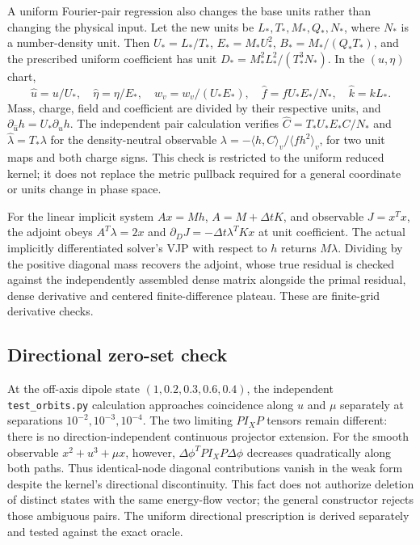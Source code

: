 \documentclass[11pt,letterpaper]{article}
\begin{document}
A uniform Fourier-pair regression also changes the base units rather than
changing the physical input. Let the new units be $L_*,T_*,M_*,Q_*,N_*$,
where $N_*$ is a number-density unit. Then $U_*=L_*/T_*$,
$E_*=M_*U_*^2$, $B_*=M_*/(Q_*T_*)$, and the prescribed uniform coefficient
has unit $D_*=M_*^2L_*^2/(T_*^3N_*)$. In the $(u,\eta)$ chart,
\[
 \widehat u=u/U_*,\quad\widehat\eta=\eta/E_*,\quad
 \widehat w_v=w_v/(U_*E_*),\quad
 \widehat f=fU_*E_*/N_*,\quad\widehat k=kL_*.
\]
Mass, charge, field and coefficient are divided by their respective units,
and $\partial_{\widehat u}h=U_*\partial_u h$.
The independent pair calculation verifies
$\widehat C=T_*U_*E_*C/N_*$ and
$\widehat\lambda=T_*\lambda$ for the density-neutral observable
$\lambda=-\langle h,C\rangle_v/\langle f h^2\rangle_v$,
for two unit maps and both charge signs. This check is restricted to the
uniform reduced kernel; it does not replace the metric pullback required
for a general coordinate or units change in phase space.

For the linear implicit system $A x=Mh$, $A=M+\Delta t K$, and observable
$J=x^Tx$, the adjoint obeys $A^T\lambda=2x$ and
$\partial_DJ=-\Delta t\lambda^TKx$ at unit coefficient.
The actual implicitly differentiated solver's VJP with respect to $h$
returns $M\lambda$. Dividing by the positive diagonal mass recovers the
adjoint, whose true residual is checked against the independently assembled
dense matrix alongside the primal residual, dense derivative and centered
finite-difference plateau. These are finite-grid derivative checks.

\subsection*{Directional zero-set check}
At the off-axis dipole state $(1,0.2,0.3,0.6,0.4)$, the independent
\texttt{test\_orbits.py} calculation approaches coincidence along $u$ and
$\mu$ separately at separations $10^{-2},10^{-3},10^{-4}$. The two limiting
$P I_XP$ tensors remain different: there is no direction-independent continuous
projector extension. For the smooth observable $x^2+u^3+\mu x$, however,
$\Delta\phi^TP I_XP\Delta\phi$ decreases quadratically along both paths.
Thus identical-node diagonal contributions vanish in the weak form despite
the kernel's directional discontinuity. This fact does not authorize deletion
of distinct states with the same energy-flow vector; the general constructor
rejects those ambiguous pairs. The uniform directional prescription is derived
separately and tested against the exact oracle.
\end{document}
